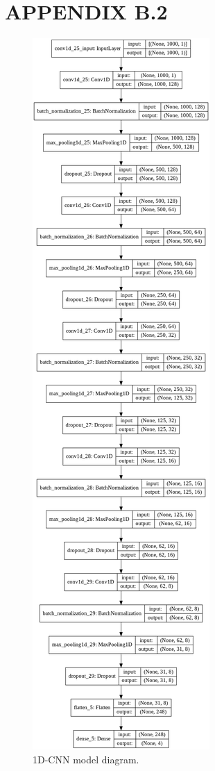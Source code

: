 \section*{APPENDIX B.2}

\begin{figure}[!ht]
	\centering
	\includegraphics[scale = 0.18,keepaspectratio=true]{./fig/cnnmodeldiag.PNG}
	\caption{1D-CNN model diagram.}	
	\label{cnnmodel}
\end{figure}

